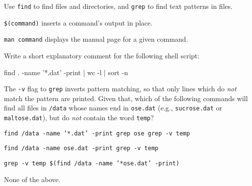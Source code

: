 \begin{keypoints}
\begin{swcitemize}
\item
  Use \texttt{find} to find files and directories, and \texttt{grep} to
  find text patterns in files.
\item
  \texttt{\$(command)} inserts a command's output in place.
\item
  \texttt{man command} displays the manual page for a given command.
\end{swcitemize}
\end{keypoints}

\begin{challenge}
  Write a short explanatory comment for the following shell script:

\begin{VerbIn}
find . -name '*.dat' -print | wc -l | sort -n
\end{VerbIn}
\end{challenge}

\begin{challenge}
  The \texttt{-v} flag to \texttt{grep} inverts pattern matching, so
  that only lines which do \emph{not} match the pattern are printed.
  Given that, which of the following commands will find all files in
  \texttt{/data} whose names end in \texttt{ose.dat} (e.g.,
  \texttt{sucrose.dat} or \texttt{maltose.dat}), but do \emph{not}
  contain the word \texttt{temp}?

  \begin{swcenumerate}
  \item
    \texttt{find /data -name '*.dat' -print \textbar{} grep ose \textbar{} grep -v temp}
  \item
    \texttt{find /data -name ose.dat -print \textbar{} grep -v temp}
  \item
    \texttt{grep -v temp \$(find /data -name '*ose.dat' -print)}
  \item
    None of the above.
  \end{swcenumerate}
\end{challenge}

